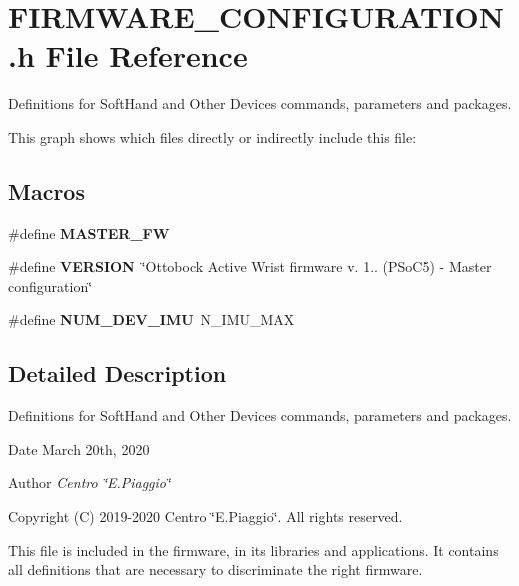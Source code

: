 \section{F\+I\+R\+M\+W\+A\+R\+E\+\_\+\+C\+O\+N\+F\+I\+G\+U\+R\+A\+T\+I\+O\+N.\+h File Reference}
\label{_f_i_r_m_w_a_r_e___c_o_n_f_i_g_u_r_a_t_i_o_n_8h}


Definitions for Soft\+Hand and Other Devices commands, parameters and packages.  


This graph shows which files directly or indirectly include this file\+:
\subsection*{Macros}
\begin{DoxyCompactItemize}
\item 
\mbox{\label{_f_i_r_m_w_a_r_e___c_o_n_f_i_g_u_r_a_t_i_o_n_8h_a928d8c902fb82fb70fdbf2988e1c3eeb}} 
\#define {\bfseries M\+A\+S\+T\+E\+R\+\_\+\+FW}
\item 
\mbox{\label{_f_i_r_m_w_a_r_e___c_o_n_f_i_g_u_r_a_t_i_o_n_8h_a1c6d5de492ac61ad29aec7aa9a436bbf}} 
\#define {\bfseries V\+E\+R\+S\+I\+ON}~\char`\"{}Ottobock Active Wrist firmware v. 1.. (P\+So\+C5) -\/ Master configuration\char`\"{}
\item 
\mbox{\label{_f_i_r_m_w_a_r_e___c_o_n_f_i_g_u_r_a_t_i_o_n_8h_a44dee30c25c70368dd064f50fcdc5c21}} 
\#define {\bfseries N\+U\+M\+\_\+\+D\+E\+V\+\_\+\+I\+MU}~N\+\_\+\+I\+M\+U\+\_\+\+M\+AX
\end{DoxyCompactItemize}


\subsection{Detailed Description}
Definitions for Soft\+Hand and Other Devices commands, parameters and packages. 

\begin{DoxyDate}{Date}
March 20th, 2020 
\end{DoxyDate}
\begin{DoxyAuthor}{Author}
{\itshape Centro \char`\"{}\+E.\+Piaggio\char`\"{}} 
\end{DoxyAuthor}
\begin{DoxyCopyright}{Copyright}
(C) 2019-\/2020 Centro \char`\"{}\+E.\+Piaggio\char`\"{}. All rights reserved.
\end{DoxyCopyright}
This file is included in the firmware, in its libraries and applications. It contains all definitions that are necessary to discriminate the right firmware. 